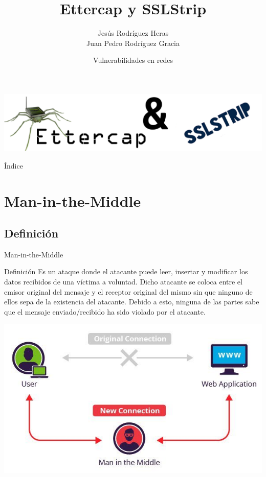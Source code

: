\documentclass{beamer}
\title{Ettercap y SSLStrip}
\author{Jesús Rodríguez Heras \\ Juan Pedro Rodríguez Gracia}
\date{Vulnerabilidades en redes}
\begin{document}
\begin{frame}
  \titlepage
  \begin{center}
  \includegraphics[scale=0.2]{Portada.png}	
  \end{center}
  
\end{frame}

\begin{frame}{Índice}
  \tableofcontents
\end{frame}


\section{Man-in-the-Middle}
\subsection{Definición}
\begin{frame}{Man-in-the-Middle}
	\begin{block}{Definición}
		Es un ataque donde el atacante puede leer, insertar y modificar los datos recibidos de una víctima a voluntad. Dicho atacante se coloca entre el emisor original del mensaje y el receptor original del mismo sin que ninguno de ellos sepa de la existencia del atacante. Debido a esto, ninguna de las partes sabe que el mensaje enviado/recibido ha sido violado por el atacante.
	\end{block}
	\begin{center}
		\includegraphics[scale=0.35]{mitm.jpg}
	\end{center}
\end{frame}
\end{document}
